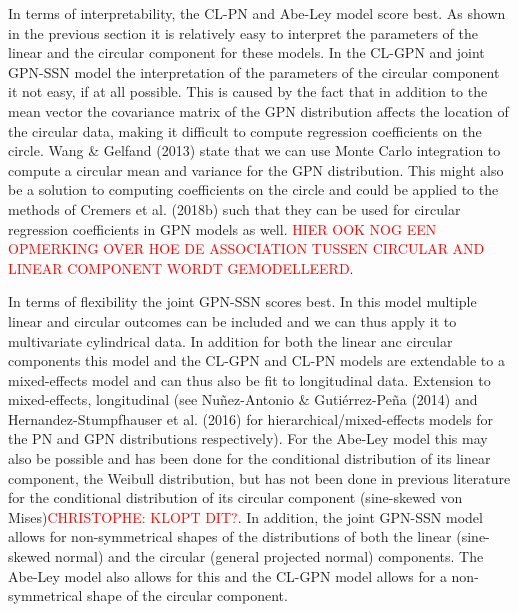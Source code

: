 \documentclass[11pt,]{article}
\begin{document}
In terms of interpretability, the CL-PN and Abe-Ley model score best. As
shown in the previous section it is relatively easy to interpret the
parameters of the linear and the circular component for these models. In
the CL-GPN and joint GPN-SSN model the interpretation of the parameters
of the circular component it not easy, if at all possible. This is
caused by the fact that in addition to the mean vector the covariance
matrix of the GPN distribution affects the location of the circular
data, making it difficult to compute regression coefficients on the
circle. Wang \& Gelfand (2013) state that we can use Monte Carlo
integration to compute a circular mean and variance for the GPN
distribution. This might also be a solution to computing coefficients on
the circle and could be applied to the methods of Cremers et al. (2018b)
such that they can be used for circular regression coefficients in GPN
models as well. \textcolor{red}{HIER OOK
NOG EEN OPMERKING OVER HOE DE ASSOCIATION TUSSEN CIRCULAR AND LINEAR COMPONENT
WORDT GEMODELLEERD}.

In terms of flexibility the joint GPN-SSN scores best. In this model
multiple linear and circular outcomes can be included and we can thus
apply it to multivariate cylindrical data. In addition for both the
linear anc circular components this model and the CL-GPN and CL-PN
models are extendable to a mixed-effects model and can thus also be fit
to longitudinal data. Extension to mixed-effects, longitudinal (see
Nuñez-Antonio \& Gutiérrez-Peña (2014) and Hernandez-Stumpfhauser et al.
(2016) for hierarchical/mixed-effects models for the PN and GPN
distributions respectively). For the Abe-Ley model this may also be
possible and has been done for the conditional distribution of its
linear component, the Weibull distribution, but has not been done in
previous literature for the conditional distribution of its circular
component (sine-skewed von
Mises)\textcolor{red}{CHRISTOPHE: KLOPT DIT?}. In addition, the joint
GPN-SSN model allows for non-symmetrical shapes of the distributions of
both the linear (sine-skewed normal) and the circular (general projected
normal) components. The Abe-Ley model also allows for this and the
CL-GPN model allows for a non-symmetrical shape of the circular
component.
\end{document}
